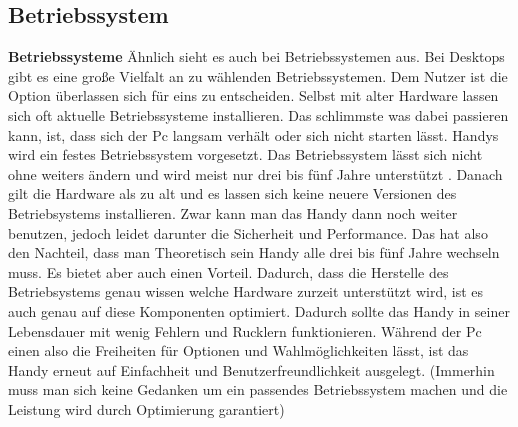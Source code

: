 \subsection{Betriebssystem}

\myNewSection
\textbf{Betriebssysteme} Ähnlich sieht es auch bei Betriebssystemen aus. Bei Desktops gibt es eine große Vielfalt an zu wählenden Betriebssystemen. Dem Nutzer ist die Option überlassen sich für eins zu entscheiden. Selbst mit alter Hardware lassen sich oft aktuelle Betriebssysteme installieren. Das schlimmste was dabei passieren kann, ist, dass sich der Pc langsam verhält oder sich nicht starten lässt.\newline%
Handys wird ein festes Betriebssystem vorgesetzt. Das Betriebssystem lässt sich nicht ohne weiters ändern und wird meist nur drei bis fünf Jahre unterstützt \cite{pcVsphone_deviceSupportGoogle}\cite{pcVsphone_deviceSupportApple}. Danach gilt die Hardware als zu alt und es lassen sich keine neuere Versionen des Betriebsystems installieren. Zwar kann man das Handy dann noch weiter benutzen, jedoch leidet darunter die Sicherheit und Performance. Das hat also den Nachteil, dass man Theoretisch sein Handy alle drei bis fünf Jahre wechseln muss. Es bietet aber auch einen Vorteil. Dadurch, dass die Herstelle des Betriebsystems genau wissen welche Hardware zurzeit unterstützt wird, ist es auch genau auf diese Komponenten optimiert. Dadurch sollte das Handy in seiner Lebensdauer mit wenig Fehlern und Rucklern funktionieren.\newline%
Während der Pc einen also die Freiheiten für Optionen und Wahlmöglichkeiten lässt, ist das Handy erneut auf Einfachheit und Benutzerfreundlichkeit ausgelegt. (Immerhin muss man sich keine Gedanken um ein passendes Betriebssystem machen und die Leistung wird durch Optimierung garantiert)
	
